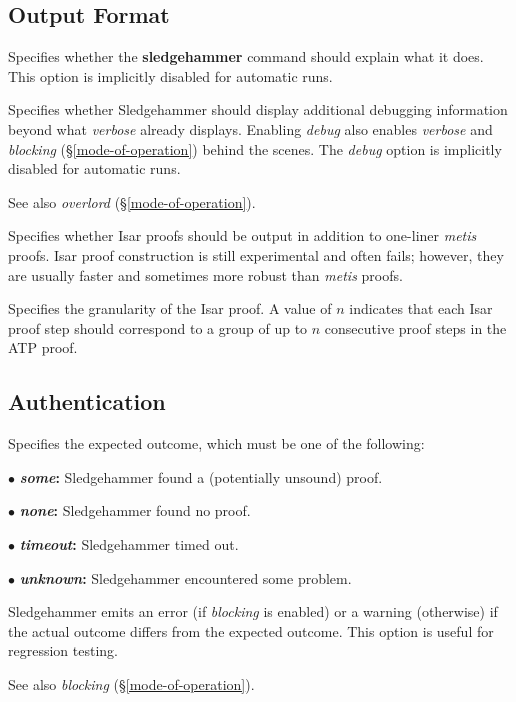 \documentclass[a4paper,12pt]{article}
\begin{document}
\subsection{Output Format}
\label{output-format}

\begin{enum}

Specifies whether the \textbf{sledgehammer} command should explain what it does.
This option is implicitly disabled for automatic runs.

Specifies whether Sledgehammer should display additional debugging information
beyond what \textit{verbose} already displays. Enabling \textit{debug} also
enables \textit{verbose} and \textit{blocking} (\S\ref{mode-of-operation})
behind the scenes. The \textit{debug} option is implicitly disabled for
automatic runs.

\nopagebreak
{\small See also \textit{overlord} (\S\ref{mode-of-operation}).}

Specifies whether Isar proofs should be output in addition to one-liner
\textit{metis} proofs. Isar proof construction is still experimental and often
fails; however, they are usually faster and sometimes more robust than
\textit{metis} proofs.

Specifies the granularity of the Isar proof. A value of $n$ indicates that each
Isar proof step should correspond to a group of up to $n$ consecutive proof
steps in the ATP proof.

\end{enum}

\subsection{Authentication}
\label{authentication}

\begin{enum}
Specifies the expected outcome, which must be one of the following:

\begin{enum}
\item[$\bullet$] \textbf{\textit{some}:} Sledgehammer found a (potentially
unsound) proof.
\item[$\bullet$] \textbf{\textit{none}:} Sledgehammer found no proof.
\item[$\bullet$] \textbf{\textit{timeout}:} Sledgehammer timed out.
\item[$\bullet$] \textbf{\textit{unknown}:} Sledgehammer encountered some
problem.
\end{enum}

Sledgehammer emits an error (if \textit{blocking} is enabled) or a warning
(otherwise) if the actual outcome differs from the expected outcome. This option
is useful for regression testing.

\nopagebreak
{\small See also \textit{blocking} (\S\ref{mode-of-operation}).}
\end{enum}

\let\em=\sl
{}

\end{document}
